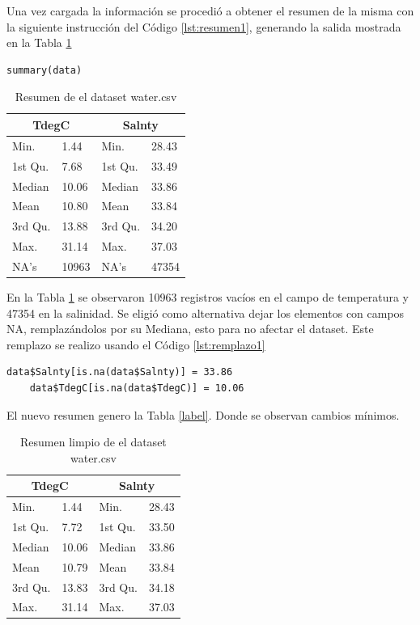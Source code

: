 \documentclass[sigconf]{acmart}
\begin{document}
Una vez cargada la información se procedió a obtener el resumen de la misma con la siguiente instrucción del Código \ref{lst:resumen1}, generando la salida mostrada en la Tabla \ref{tab:Tabla1}

\begin{lstlisting}[caption=Resumen de los datos,breaklines,label=lst:resumen1]
summary(data)
\end{lstlisting}

\begin{table}
	\begin{tabularx}{\columnwidth}{|X|X|X|X|}
		\hline
		\multicolumn{2}{|c|}{ TdegC } & \multicolumn{2}{|c|}{ Salnty }  \\
		\hline
		Min. & 1.44  & Min. & 28.43 \\
		\hline
		1st Qu.& 7.68 &1st Qu.&33.49 \\
		\hline
		Median &10.06  & Median & 33.86   \\
		\hline
		Mean & 10.80 & Mean & 33.84\\
		\hline
		3rd Qu.&13.88 & 3rd Qu. & 34.20\\
		\hline
		Max. & 31.14 & Max.& 37.03  \\
		\hline
		NA's & 10963 & NA's  & 47354\\
		\hline
	\end{tabularx}
	\caption{\label{tab:Tabla1}Resumen de el dataset water.csv}
\end{table}

En la Tabla \ref{tab:Tabla1} se observaron 10963 registros vacíos en el campo de temperatura y 47354 en la salinidad.
Se eligió como alternativa dejar los elementos con campos NA, remplazándolos por su Mediana, esto para no afectar el dataset. Este remplazo se realizo usando el Código \ref{lst:remplazo1}

\begin{lstlisting}[caption=Código de emplazo de los NA,breaklines,label=lst:remplazo1]
	data$Salnty[is.na(data$Salnty)] = 33.86
	data$TdegC[is.na(data$TdegC)] = 10.06
\end{lstlisting}

El nuevo resumen genero la Tabla \ref{label}. Donde se observan cambios mínimos.

\begin{table}
	\begin{tabularx}{\columnwidth}{|X|X|X|X|}
		\hline
		\multicolumn{2}{|c|}{ TdegC } & \multicolumn{2}{|c|}{ Salnty }  \\
		\hline
		Min. & 1.44  & Min. & 28.43 \\
		\hline
		1st Qu.& 7.72 &1st Qu.&33.50 \\
		\hline
		Median &10.06  & Median & 33.86   \\
		\hline
		Mean & 10.79 & Mean & 33.84\\
		\hline
		3rd Qu.&13.83 & 3rd Qu. & 34.18\\
		\hline
		Max. & 31.14 & Max.& 37.03  \\
		\hline
	\end{tabularx}
	\caption{\label{tab:Tabla2}Resumen limpio de el dataset water.csv}
\end{table}
\end{document}

